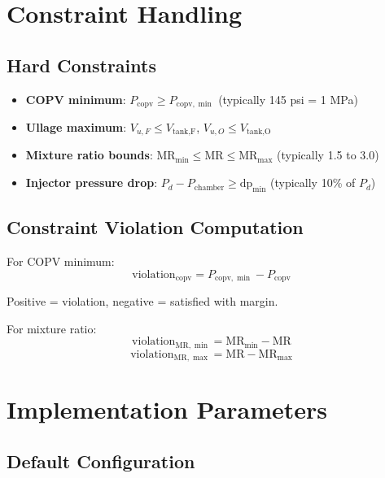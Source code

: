 \documentclass[11pt,a4paper]{article}
\begin{document}
\section{Constraint Handling}

\subsection{Hard Constraints}

\begin{itemize}
    \item \textbf{COPV minimum}: $P_{\text{copv}} \geq P_{\text{copv},\min}$ (typically 145 psi = 1 MPa)
    \item \textbf{Ullage maximum}: $V_{u,F} \leq V_{\text{tank,F}}$, $V_{u,O} \leq V_{\text{tank,O}}$
    \item \textbf{Mixture ratio bounds}: $\text{MR}_{\min} \leq \text{MR} \leq \text{MR}_{\max}$ (typically 1.5 to 3.0)
    \item \textbf{Injector pressure drop}: $P_d - P_{\text{chamber}} \geq \text{dp}_{\min}$ (typically 10\% of $P_d$)
\end{itemize}

\subsection{Constraint Violation Computation}

For COPV minimum:
\begin{equation}
\text{violation}_{\text{copv}} = P_{\text{copv},\min} - P_{\text{copv}}
\end{equation}

Positive = violation, negative = satisfied with margin.

For mixture ratio:
\begin{equation}
\text{violation}_{\text{MR},\min} = \text{MR}_{\min} - \text{MR}
\end{equation}
\begin{equation}
\text{violation}_{\text{MR},\max} = \text{MR} - \text{MR}_{\max}
\end{equation}

\section{Implementation Parameters}

\subsection{Default Configuration}
\end{document}
